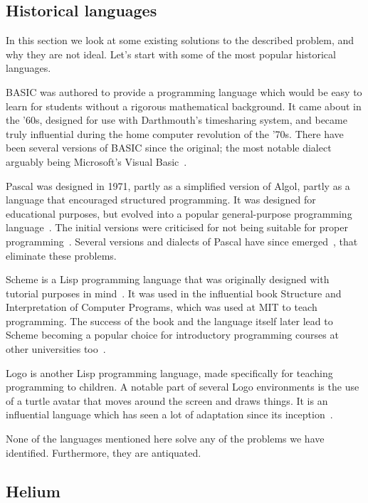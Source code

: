 \subsection{Historical languages}
In this section we look at some existing solutions to the described problem,
and why they are not ideal. Let's start with some of the most popular
historical languages.

BASIC was authored to provide a programming language which would be easy to
learn for students without a rigorous mathematical background. It came about in
the '60s, designed for use with Darthmouth's timesharing system, and became
truly influential during the home computer revolution of the '70s. There have
been several versions of BASIC since the original; the most notable dialect
arguably being Microsoft's Visual Basic~\cite{time2014basic}.

Pascal was designed in 1971, partly as a simplified version of Algol, partly as
a language that encouraged structured programming. It was designed for
educational purposes, but evolved into a popular general-purpose programming
language~\cite{cantu2008essential}. The initial versions were criticised for
not being suitable for proper programming~\cite{kernighan1981pascal}. Several
versions and dialects of Pascal have since emerged~\cite{cantu2008essential},
that eliminate these problems.

Scheme is a Lisp programming language that was originally designed with
tutorial purposes in mind~\cite{sussman1998scheme}. It was used in the
influential book Structure and Interpretation of Computer Programs, which was
used at MIT to teach programming. The success of the book and the language
itself later lead to Scheme becoming a popular choice for introductory
programming courses at other universities too~\cite{felleisen2004structure}.

Logo is another Lisp programming language, made specifically for teaching
programming to children. A notable part of several Logo environments is the use
of a turtle avatar that moves around the screen and draws things. It is an
influential language which has seen a lot of adaptation since its
inception~\cite{logo2011whatislogo}.

None of the languages mentioned here solve any of the problems we have
identified. Furthermore, they are antiquated.

\subsection{Helium}

